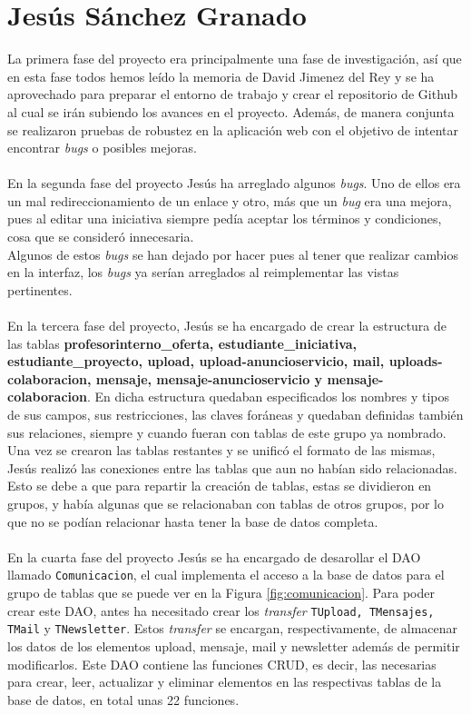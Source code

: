 \documentclass[11pt]{book}
\begin{document}
	\section{Jesús Sánchez Granado}
La primera fase del proyecto era principalmente una fase de investigación, así que en esta fase todos hemos leído la memoria de David Jimenez del Rey y se ha aprovechado para preparar el entorno de trabajo y crear el repositorio de Github al cual se irán subiendo los avances en el proyecto. Además, de manera conjunta se realizaron pruebas de robustez en la aplicación web con el objetivo de intentar encontrar \emph{bugs} o posibles mejoras.\\\\
En la segunda fase del proyecto Jesús ha arreglado algunos \emph{bugs}. Uno de ellos era un mal redireccionamiento de un enlace y otro, más que un \emph{bug} era una mejora, pues al editar una iniciativa siempre pedía aceptar los términos y condiciones, cosa que se consideró innecesaria.\\
Algunos de estos \emph{bugs} se han dejado por hacer pues al tener que realizar cambios en la interfaz, los \emph{bugs} ya serían arreglados al reimplementar las vistas pertinentes.\\\\
En la tercera fase del proyecto, Jesús se ha encargado de crear la estructura de las tablas \textbf{profesorinterno\_oferta, estudiante\_iniciativa, estudiante\_proyecto, upload, upload-anuncioservicio, mail, uploads-colaboracion, mensaje, mensaje-anuncioservicio y mensaje-colaboracion}. En dicha estructura quedaban especificados los nombres y tipos de sus campos, sus restricciones, las claves foráneas y quedaban definidas también sus relaciones, siempre y cuando fueran con tablas de este grupo ya nombrado.\\
Una vez se crearon las tablas restantes y se unificó el formato de las mismas, Jesús realizó las conexiones entre las tablas que aun no habían sido relacionadas. Esto se debe a que para repartir la creación de tablas, estas se dividieron en grupos, y había algunas que se relacionaban con tablas de otros grupos, por lo que no se podían relacionar hasta tener la base de datos completa.\\\\
En la cuarta fase del proyecto Jesús se ha encargado de desarollar el DAO llamado \texttt{Comunicacion}, el cual implementa el acceso a la base de datos para el grupo de tablas que se puede ver en la Figura \ref{fig:comunicacion}. Para poder crear este DAO, antes ha necesitado crear los \emph{transfer} \texttt{TUpload, TMensajes, TMail} y \texttt{TNewsletter}. Estos \emph{transfer} se encargan, respectivamente, de almacenar los datos de los elementos upload, mensaje, mail y newsletter además de permitir modificarlos. Este DAO contiene las funciones CRUD, es decir, las necesarias para crear, leer, actualizar y eliminar elementos en las respectivas tablas de la base de datos, en total unas 22 funciones. \\
\end{document}
